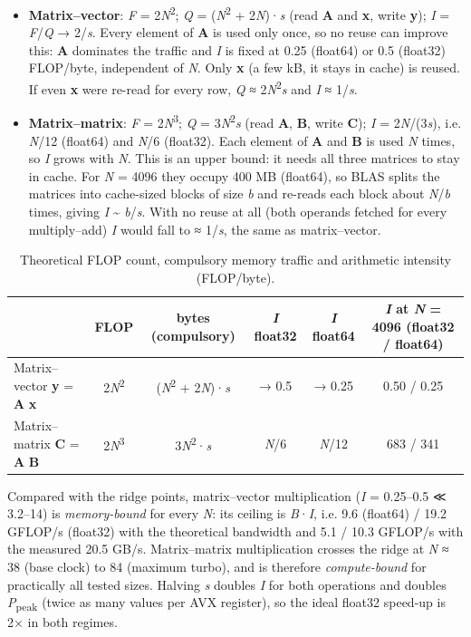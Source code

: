 \documentclass[10pt,a4paper]{article}
\begin{document}
\begin{itemize}
\item \textbf{Matrix–vector}: \emph{F} = 2\emph{N}\textsuperscript{2}; \emph{Q} = (\emph{N}\textsuperscript{2} + 2\emph{N})·\emph{s} (read \textbf{A} and \textbf{x}, write \textbf{y}); \emph{I} = \emph{F}/\emph{Q} → 2/\emph{s}. Every element of \textbf{A} is used only once, so no reuse can improve this: \textbf{A} dominates the traffic and \emph{I} is fixed at 0.25 (float64) or 0.5 (float32) FLOP/byte, independent of \emph{N}. Only \textbf{x} (a few kB, it stays in cache) is reused. If even \textbf{x} were re-read for every row, \emph{Q} ≈ 2\emph{N}\textsuperscript{2}\emph{s} and \emph{I} ≈ 1/\emph{s}.
\item \textbf{Matrix–matrix}: \emph{F} = 2\emph{N}\textsuperscript{3}; \emph{Q} = 3\emph{N}\textsuperscript{2}\emph{s} (read \textbf{A}, \textbf{B}, write \textbf{C}); \emph{I} = 2\emph{N}/(3\emph{s}), i.e. \emph{N}/12 (float64) and \emph{N}/6 (float32). Each element of \textbf{A} and \textbf{B} is used \emph{N} times, so \emph{I} grows with \emph{N}. This is an upper bound: it needs all three matrices to stay in cache. For \emph{N} = 4096 they occupy 400 MB (float64), so BLAS splits the matrices into cache-sized blocks of size \emph{b} and re-reads each block about \emph{N}/\emph{b} times, giving \emph{I} \textasciitilde{} \emph{b}/\emph{s}. With no reuse at all (both operands fetched for every multiply–add) \emph{I} would fall to ≈ 1/\emph{s}, the same as matrix–vector.
\end{itemize}
\begin{table}[h]\centering\small
\begin{tabular}{lccccc}\toprule
 & FLOP & bytes (compulsory) & \emph{I} float32 & \emph{I} float64 & \emph{I} at \emph{N} = 4096 (float32 / float64) \\\midrule
Matrix–vector \textbf{y} = \textbf{A} \textbf{x} & 2\emph{N}\textsuperscript{2} & (\emph{N}\textsuperscript{2} + 2\emph{N})·\emph{s} & → 0.5 & → 0.25 & 0.50 / 0.25 \\
Matrix–matrix \textbf{C} = \textbf{A} \textbf{B} & 2\emph{N}\textsuperscript{3} & 3\emph{N}\textsuperscript{2}·\emph{s} & \emph{N}/6 & \emph{N}/12 & 683 / 341 \\
\bottomrule\end{tabular}
\caption{Theoretical FLOP count, compulsory memory traffic and arithmetic intensity (FLOP/byte).}
\end{table}

Compared with the ridge points, matrix–vector multiplication (\emph{I} = 0.25–0.5 ≪ 3.2–14) is \emph{memory-bound} for every \emph{N}: its ceiling is \emph{B}·\emph{I}, i.e. 9.6 (float64) / 19.2 GFLOP/s (float32) with the theoretical bandwidth and 5.1 / 10.3 GFLOP/s with the measured 20.5 GB/s. Matrix–matrix multiplication crosses the ridge at \emph{N} ≈ 38 (base clock) to 84 (maximum turbo), and is therefore \emph{compute-bound} for practically all tested sizes. Halving \emph{s} doubles \emph{I} for both operations and doubles \emph{P}\textsubscript{peak} (twice as many values per AVX register), so the ideal float32 speed-up is 2× in both regimes.
\end{document}
